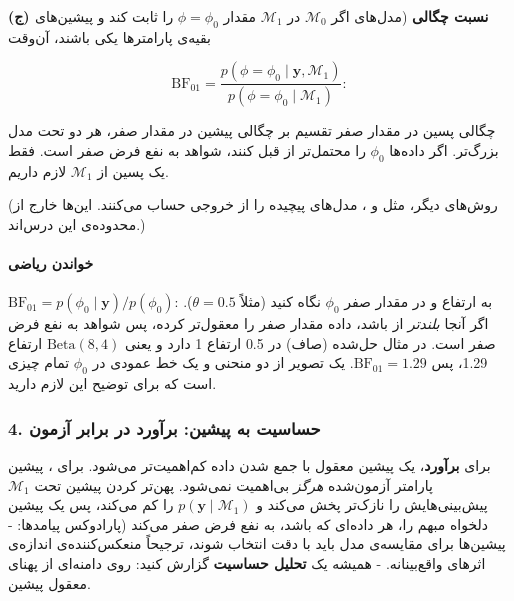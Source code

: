 \textbf{(ج) نسبت چگالی } (مدل‌های  اگر
\(\mathcal{M}_0\) در \(\mathcal{M}_1\) مقدار \(\phi = \phi_0\) را ثابت
کند و پیشین‌های بقیه‌ی پارامترها یکی باشند، آن‌وقت

\[
\mathrm{BF}_{01} = \frac{p(\phi = \phi_0 \mid \mathbf{y}, \mathcal{M}_1)}{p(\phi = \phi_0 \mid \mathcal{M}_1)}:
\]

چگالی پسین در مقدار صفر تقسیم بر چگالی پیشین در مقدار صفر، هر دو تحت مدل
بزرگ‌تر. اگر داده‌ها \(\phi_0\) را محتمل‌تر از قبل کنند، شواهد به نفع فرض
صفر است. فقط یک پسین از \(\mathcal{M}_1\) لازم داریم.

(روش‌های دیگر، مثل  و ،
 مدل‌های پیچیده را از خروجی  حساب
می‌کنند. این‌ها خارج از محدوده‌ی این درس‌اند.)

\paragraph{خواندن ریاضی}

\textbf{}
\(\mathrm{BF}_{01} = p(\phi_0 \mid \mathbf{y}) / p(\phi_0)\): به ارتفاع
 و  در مقدار صفر \(\phi_0\) نگاه کنید (مثلاً
\(\theta = 0.5\)). اگر  آنجا \emph{بلندتر} از 
باشد، داده مقدار صفر را معقول‌تر کرده، پس شواهد به نفع فرض صفر است. در
مثال حل‌شده  (صاف) در 0.5 ارتفاع 1 دارد و  یعنی
\(\mathrm{Beta}(8,4)\) ارتفاع 1.29، پس \(\mathrm{BF}_{01} = 1.29\). یک
تصویر از دو منحنی و یک خط عمودی در \(\phi_0\) تمام چیزی است که برای
توضیح این لازم دارید.

\subsubsection{4. حساسیت به پیشین: برآورد در برابر آزمون}

برای \textbf{برآورد}، یک پیشین معقول با جمع شدن داده کم‌اهمیت‌تر می‌شود.
برای \textbf{}، پیشین پارامتر آزمون‌شده \emph{هرگز}
بی‌اهمیت نمی‌شود. پهن‌تر کردن پیشین تحت \(\mathcal{M}_1\) پیش‌بینی‌هایش را
نازک‌تر پخش می‌کند و \(p(\mathbf{y}\mid\mathcal{M}_1)\) را کم می‌کند، پس یک
پیشین دلخواه مبهم  را، هر داده‌ای که باشد، به نفع فرض
صفر می‌کند (پارادوکس  پیامدها: - پیشین‌ها برای
مقایسه‌ی مدل باید با دقت انتخاب شوند، ترجیحاً منعکس‌کننده‌ی اندازه‌ی اثرهای
واقع‌بینانه. - همیشه یک \textbf{تحلیل حساسیت} گزارش کنید:  روی دامنه‌ای از پهنای معقول پیشین.

